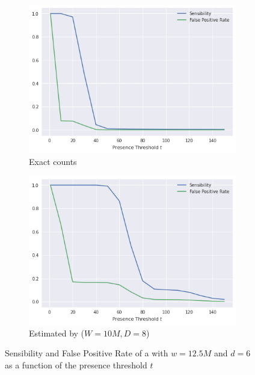 \begin{figure}[htbp]
    \centering
    \begin{subfigure}{.5\textwidth}
        \centering
        \includegraphics[width=\textwidth]{figures/e_coli-threshold_exploration-K31-exact}
        \caption{Exact counts}\label{fig:ecoli-art-dbcm-threshold-exact}
    \end{subfigure}%
    \begin{subfigure}{.5\textwidth}
        \centering
        \includegraphics[width=\textwidth]{figures/e_coli-threshold_exploration-K31-W10000000-D6}
        \caption{Estimated by \dBCM ($W=10M, D=8$)}\label{fig:ecoli-art-dbcm-threshold-estimated}
    \end{subfigure}
    \caption{Sensibility and False Positive Rate of a \dBCM with $w = 12.5M$ and $d = 6$ as a function of the presence threshold $t$}\label{fig:ecoli-art-dbcm-threshold}
\end{figure}

